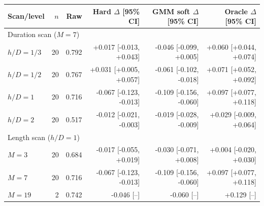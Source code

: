 \begin{tabular}{lrrrrr}
\toprule
Scan/level & $n$ & Raw & Hard $\Delta$ [95\% CI] & GMM soft $\Delta$ [95\% CI] & Oracle $\Delta$ [95\% CI] \\
\midrule
\multicolumn{6}{l}{Duration scan ($M=7$)} \\
$h/D=1/3$ & 20 & 0.792 & +0.017 [-0.013, +0.043] & -0.046 [-0.099, +0.005] & +0.060 [+0.044, +0.074] \\
$h/D=1/2$ & 20 & 0.767 & +0.031 [+0.005, +0.057] & -0.061 [-0.102, -0.018] & +0.071 [+0.052, +0.092] \\
$h/D=1$ & 20 & 0.716 & -0.067 [-0.123, -0.013] & -0.109 [-0.156, -0.060] & +0.097 [+0.077, +0.118] \\
$h/D=2$ & 20 & 0.517 & -0.012 [-0.021, -0.003] & -0.019 [-0.028, -0.009] & +0.029 [-0.009, +0.064] \\
\midrule
\multicolumn{6}{l}{Length scan ($h/D=1$)} \\
$M=3$ & 20 & 0.684 & -0.017 [-0.055, +0.019] & -0.030 [-0.071, +0.008] & +0.004 [-0.020, +0.030] \\
$M=7$ & 20 & 0.716 & -0.067 [-0.123, -0.013] & -0.109 [-0.156, -0.060] & +0.097 [+0.077, +0.118] \\
$M=19$ & 2 & 0.742 & -0.046 [--] & -0.060 [--] & +0.129 [--] \\
\bottomrule
\end{tabular}
